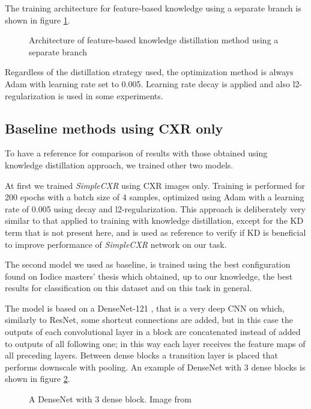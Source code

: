 The training architecture for feature-based knowledge using a separate branch is shown in figure \ref{fig:feature_based_branch_kd}.

\begin{figure}
    \centering
    \caption{Architecture of feature-based knowledge distillation method using a separate branch}
    \label{fig:feature_based_branch_kd}
\end{figure}

Regardless of the distillation strategy used, the optimization method is always Adam with learning rate set to 0.005.
Learning rate decay is applied and also l2-regularization is used in some experiments.


\subsection{Baseline methods using CXR only}

To have a reference for comparison of results with those obtained using knowledge distillation approach, we trained other two models.

At first we trained \emph{SimpleCXR} using CXR images only.
Training is performed for 200 epochs with a batch size of 4 samples, optimized using Adam with a learning rate of 0.005 using decay and l2-regularization.
This approach is deliberately very similar to that applied to training with knowledge distillation, except for the KD term that is not present here, and is used as reference to verify if KD is beneficial to improve performance of \emph{SimpleCXR} network on our task.

The second model we used as baseline, is trained using the best configuration found on Iodice masters' thesis \cite{iodice_2022} which obtained, up to our knowledge, the best results for classification on this dataset and on this task in general.

The model is based on a DenseNet-121 \cite{huang2018densely}, that is a very deep CNN on which, similarly to ResNet, some shortcut connections are added, but in this case the outputs of each convolutional layer in a block are concatenated instead of added to outputs of all following one; in this way each layer receives the feature maps of all preceding layers.
Between dense blocks a transition layer is placed that performs downscale with pooling.
An example of DenseNet with 3 dense blocks is shown in figure \ref{fig:densenet}.

\begin{figure}
    \centering
    \caption{A DenseNet with 3 dense block. Image from \cite{huang2018densely}}
    \label{fig:densenet}
\end{figure}

